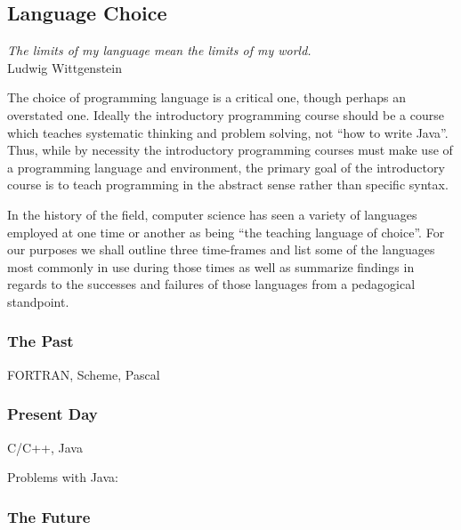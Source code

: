 \subsection{Language Choice}

\begin{flushright}
\textit{The limits of my language mean the limits of my world.}
\\
Ludwig Wittgenstein \cite{Wittgenstein22} \\
\end{flushright}

The choice of programming language is a critical one, though perhaps an overstated one.  Ideally the introductory programming course should be a course which teaches systematic thinking and problem solving, not ``how to write Java''.  Thus, while by necessity the introductory programming courses must make use of a programming language and environment, the primary goal of the introductory course is to teach programming in the abstract sense rather than specific syntax.

In the history of the field, computer science has seen a variety of languages employed at one time or another as being ``the teaching language of choice''.  For our purposes we shall outline three time-frames and list some of the languages most commonly in use during those times as well as summarize findings in regards to the successes and failures of those languages from a pedagogical standpoint.

\subsubsection{The Past}

FORTRAN, Scheme, Pascal

\subsubsection{Present Day}

C/C++, Java

Problems with Java: \cite{Bos98,Benander04}

\subsubsection{The Future}

